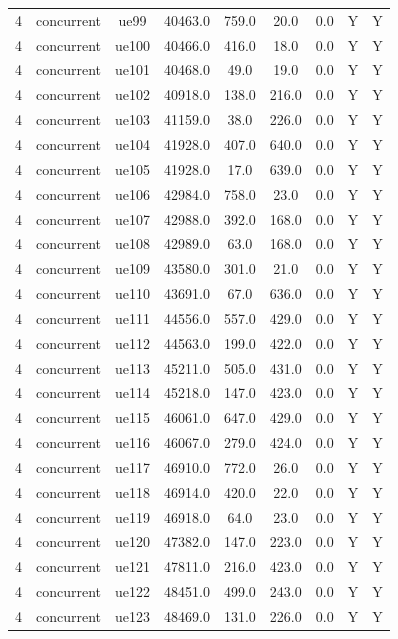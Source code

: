 \begin{table}[ht]
\begin{tabular}{|c|c|c|c|c|c|c|c|c|}
4 & concurrent & ue99 & 40463.0 & 759.0 & 20.0 & 0.0 & Y & Y \\
4 & concurrent & ue100 & 40466.0 & 416.0 & 18.0 & 0.0 & Y & Y \\
4 & concurrent & ue101 & 40468.0 & 49.0 & 19.0 & 0.0 & Y & Y \\
4 & concurrent & ue102 & 40918.0 & 138.0 & 216.0 & 0.0 & Y & Y \\
4 & concurrent & ue103 & 41159.0 & 38.0 & 226.0 & 0.0 & Y & Y \\
4 & concurrent & ue104 & 41928.0 & 407.0 & 640.0 & 0.0 & Y & Y \\
4 & concurrent & ue105 & 41928.0 & 17.0 & 639.0 & 0.0 & Y & Y \\
4 & concurrent & ue106 & 42984.0 & 758.0 & 23.0 & 0.0 & Y & Y \\
4 & concurrent & ue107 & 42988.0 & 392.0 & 168.0 & 0.0 & Y & Y \\
4 & concurrent & ue108 & 42989.0 & 63.0 & 168.0 & 0.0 & Y & Y \\
4 & concurrent & ue109 & 43580.0 & 301.0 & 21.0 & 0.0 & Y & Y \\
4 & concurrent & ue110 & 43691.0 & 67.0 & 636.0 & 0.0 & Y & Y \\
4 & concurrent & ue111 & 44556.0 & 557.0 & 429.0 & 0.0 & Y & Y \\
4 & concurrent & ue112 & 44563.0 & 199.0 & 422.0 & 0.0 & Y & Y \\
4 & concurrent & ue113 & 45211.0 & 505.0 & 431.0 & 0.0 & Y & Y \\
4 & concurrent & ue114 & 45218.0 & 147.0 & 423.0 & 0.0 & Y & Y \\
4 & concurrent & ue115 & 46061.0 & 647.0 & 429.0 & 0.0 & Y & Y \\
4 & concurrent & ue116 & 46067.0 & 279.0 & 424.0 & 0.0 & Y & Y \\
4 & concurrent & ue117 & 46910.0 & 772.0 & 26.0 & 0.0 & Y & Y \\
4 & concurrent & ue118 & 46914.0 & 420.0 & 22.0 & 0.0 & Y & Y \\
4 & concurrent & ue119 & 46918.0 & 64.0 & 23.0 & 0.0 & Y & Y \\
4 & concurrent & ue120 & 47382.0 & 147.0 & 223.0 & 0.0 & Y & Y \\
4 & concurrent & ue121 & 47811.0 & 216.0 & 423.0 & 0.0 & Y & Y \\
4 & concurrent & ue122 & 48451.0 & 499.0 & 243.0 & 0.0 & Y & Y \\
4 & concurrent & ue123 & 48469.0 & 131.0 & 226.0 & 0.0 & Y & Y \\

\end{tabular}
\end{table}
